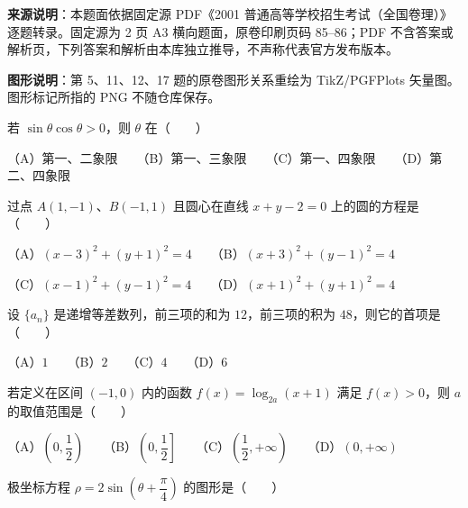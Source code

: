 


\begin{gktip}
\textbf{来源说明}：本题面依据固定源 PDF《2001 普通高等学校招生考试（全国卷理）》逐题转录。固定源为 2 页 A3 横向题面，原卷印刷页码 85–86；PDF 不含答案或解析页，下列答案和解析由本库独立推导，不声称代表官方发布版本。

\textbf{图形说明}：第 5、11、12、17 题的原卷图形关系重绘为 TikZ/PGFPlots 矢量图。图形标记所指的 PNG 不随仓库保存。
\end{gktip}


\begin{question}
若 $\sin\theta\cos\theta>0$，则 $\theta$ 在\mbox{（　　）}

（A）第一、二象限　　（B）第一、三象限　　（C）第一、四象限　　（D）第二、四象限

\end{question}
\begin{question}
过点 $A(1,-1)$、$B(-1,1)$ 且圆心在直线 $x+y-2=0$ 上的圆的方程是\mbox{（　　）}

（A）$(x-3)^2+(y+1)^2=4$　　（B）$(x+3)^2+(y-1)^2=4$

（C）$(x-1)^2+(y-1)^2=4$　　（D）$(x+1)^2+(y+1)^2=4$

\end{question}
\begin{question}
设 $\{a_n\}$ 是递增等差数列，前三项的和为 $12$，前三项的积为 $48$，则它的首项是\mbox{（　　）}

（A）$1$　　（B）$2$　　（C）$4$　　（D）$6$

\end{question}
\begin{question}
若定义在区间 $(-1,0)$ 内的函数 $f(x)=\log_{2a}(x+1)$ 满足 $f(x)>0$，则 $a$ 的取值范围是\mbox{（　　）}

（A）$\left(0,\dfrac12\right)$　　（B）$\left(0,\dfrac12\right]$　　（C）$\left(\dfrac12,+\infty\right)$　　（D）$(0,+\infty)$

\Needspace{0.4\textheight}
\end{question}
\begin{question}
极坐标方程 $\rho=2\sin\left(\theta+\dfrac\pi4\right)$ 的图形是\mbox{（　　）}
\nopagebreak[4]
\begin{center}\end{center}
\nopagebreak[4]
\end{question}
